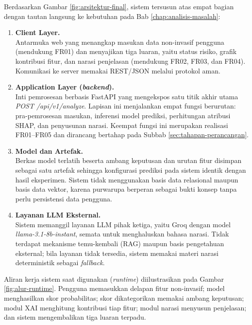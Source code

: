 Berdasarkan Gambar \ref{fig:arsitektur-final}, sistem tersusun atas empat bagian dengan tautan langsung ke kebutuhan pada Bab \ref{chap:analisis-masalah}:
\begin{enumerate}
    \item \textbf{Client Layer.} \\
    Antarmuka web yang menangkap masukan data non-invasif pengguna (mendukung FR01) dan menyajikan tiga luaran, yaitu status risiko, grafik kontribusi fitur, dan narasi penjelasan (mendukung FR02, FR03, dan FR04). Komunikasi ke server memakai REST/JSON melalui protokol aman.
    \item \textbf{Application Layer (\textit{backend}).} \\
    Inti pemrosesan berbasis FastAPI yang mengekspos satu titik akhir utama \textit{POST /api/v1/analyze}. Lapisan ini menjalankan empat fungsi berurutan: pra-pemrosesan masukan, inferensi model prediksi, perhitungan atribusi SHAP, dan penyusunan narasi. Keempat fungsi ini merupakan realisasi FR01--FR05 dan dirancang bertahap pada Subbab \ref{sec:tahapan-perancangan}.
    \item \textbf{Model dan Artefak.} \\
    Berkas model terlatih beserta ambang keputusan dan urutan fitur disimpan sebagai satu artefak sehingga konfigurasi prediksi pada sistem identik dengan hasil eksperimen. Sistem tidak menggunakan basis data relasional maupun basis data vektor, karena purwarupa berperan sebagai bukti konsep tanpa perlu persistensi data pengguna.
    \item \textbf{Layanan LLM Eksternal.} \\
    Sistem memanggil layanan LLM pihak ketiga, yaitu Groq dengan model \textit{llama-3.1-8b-instant}, semata untuk menghaluskan bahasa narasi. Tidak terdapat mekanisme temu-kembali (RAG) maupun basis pengetahuan eksternal; bila layanan tidak tersedia, sistem memakai materi narasi deterministik sebagai \textit{fallback}.
\end{enumerate}

Aliran kerja sistem saat digunakan (\textit{runtime}) diilustrasikan pada Gambar \ref{fig:alur-runtime}. Pengguna memasukkan delapan fitur non-invasif; model menghasilkan skor probabilitas; skor dikategorikan memakai ambang keputusan; modul XAI menghitung kontribusi tiap fitur; modul narasi menyusun penjelasan; dan sistem mengembalikan tiga luaran terpadu.


